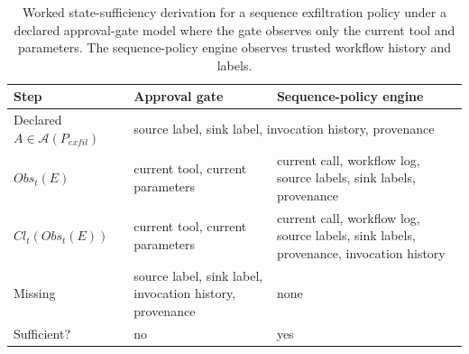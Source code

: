 \begin{table}[t]
  \caption{Worked state-sufficiency derivation for a sequence exfiltration
  policy under a declared approval-gate model where the gate observes only
  the current tool and parameters. The sequence-policy engine observes
  trusted workflow history and labels.}
  \label{tab:worked-derivation}
  \centering\footnotesize
  \begin{tabular}{@{}p{}p{}p{}@{}}
    \toprule
    Step & Approval gate & Sequence-policy engine \\
    \midrule
    Declared $A\in\mathcal{A}(P_{exfil})$ & \multicolumn{2}{p{0.66\columnwidth}}{source label, sink label, invocation history, provenance} \\
    $Obs_t(E)$ & current tool, current parameters & current call, workflow log, source labels, sink labels, provenance \\
    $Cl_t(Obs_t(E))$ & current tool, current parameters & current call, workflow log, source labels, sink labels, provenance, invocation history \\
    Missing & source label, sink label, invocation history, provenance & none \\
    Sufficient? & no & yes \\
    \bottomrule
  \end{tabular}
\end{table}
